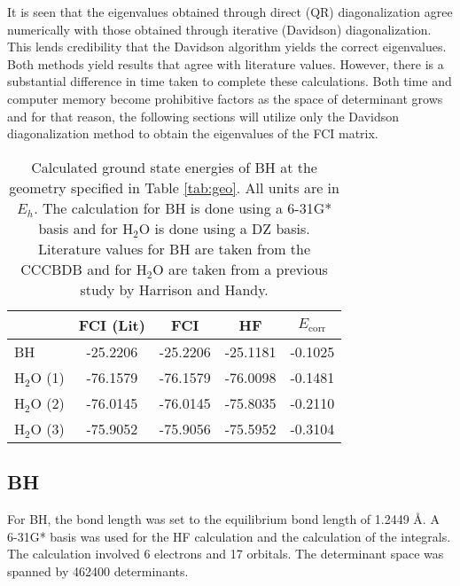 \documentclass[final,3p,times,twocolumn]{elsarticle}
\begin{document}
It is seen that the eigenvalues obtained through direct (QR) diagonalization agree numerically with those obtained through iterative (Davidson) diagonalization. This lends credibility that the Davidson algorithm yields the correct eigenvalues. Both methods yield results that agree with literature values. However, there is a substantial difference in time taken to complete these calculations. Both time and computer memory become prohibitive factors as the space of determinant grows and for that reason, the following sections will utilize only the Davidson diagonalization method to obtain the eigenvalues of the FCI matrix.


\begin{table}
\centering
\begin{tabular}{l|c|ccc} \hline\hline
& FCI (Lit) & FCI & HF & $E_{\text{corr}}$ \\ \hline
BH & -25.2206 & -25.2206 & -25.1181 & -0.1025 \\ \hline
H$_2$O (1) & -76.1579 & -76.1579 & -76.0098 & -0.1481 \\ 
H$_2$O (2) & -76.0145 & -76.0145 & -75.8035 & -0.2110 \\
H$_2$O (3) & -75.9052 & -75.9056 & -75.5952 & -0.3104 \\\hline\hline
\end{tabular}
\caption{Calculated ground state energies of BH at the geometry specified in Table \ref{tab:geo}. All units are in $E_h$. The calculation for BH is done using a 6-31G* basis\cite{bhbasis} and for H$_2$O is done using a DZ basis.\cite{dunning} Literature values for BH are taken from the CCCBDB\cite{cccbdb} and for H$_2$O are taken from a previous study by Harrison and Handy.\cite{handy-1983}}
\label{tab:results}
\end{table}
\subsection{BH} \label{sec:bhresults}

For BH, the bond length was set to the equilibrium bond length of 1.2449 \AA. A 6-31G* basis\cite{bhbasis} was used for the HF calculation and the calculation of the integrals. The calculation involved 6 electrons and 17 orbitals. The determinant space was spanned by 462400 determinants.
\end{document}
